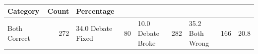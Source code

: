 \begin{tabular}{lrl}
\toprule
Category & Count & Percentage \\
\midrule
Both Correct & 272 & 34.0%
Debate Fixed & 80 & 10.0%
Debate Broke & 282 & 35.2%
Both Wrong & 166 & 20.8%
\bottomrule
\end{tabular}
